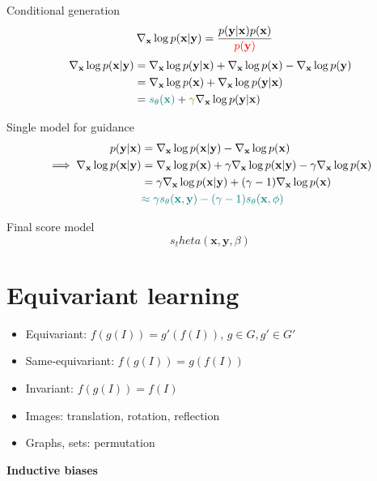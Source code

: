 \documentclass[handout, aspectratio=169,xcolor=dvipsnames]{beamer}
\newcommand{\bx}{\mathbf{x}}
\newcommand{\by}{\mathbf{y}}
\newcommand{\nbx}{\nabla_{\bx}}
\begin{document}
\begin{frame}{Conditional generation}
  \begin{align*}
   \nbx \log p(\bx | \by) &= \frac{p(\by | \bx) p(\bx)}{\textcolor{red}{p(\by)}}
  \end{align*}
  \pause
  \begin{align*}
    \nbx \log p(\bx | \by) &= \nbx \log p(\by | \bx) + \nbx \log p(\bx) - \nbx \log p(\by)\\
                           &= \nbx \log p(\bx) + \nbx \log p(\by | \bx) \\
                           &= \textcolor{teal}{s_\theta(\bx)} + \textcolor{olive}{\gamma} \nbx \log p(\by | \bx)
  \end{align*}
\end{frame}

\begin{frame}{Single model for guidance}
  \begin{align*}
    p(\by | \bx) &= \nbx \log p(\bx | \by) - \nbx \log p(\bx)\\
    \implies  \nbx \log p(\bx | \by) &= \nbx \log p(\bx) + \gamma \nbx \log p(\bx | \by) - \gamma \nbx \log p(\bx) \\
                                     &= \gamma \nbx \log p(\bx | \by) + (\gamma - 1)  \nbx \log p(\bx)\\
                                     &\textcolor{teal}{\approx \gamma s_\theta(\bx, \by) - (\gamma - 1) s_\theta(\bx, \phi)}
  \end{align*}
\end{frame}

\begin{frame}{Final score model}
  \[
  s_theta(\bx, \by, \beta)
  \]
\end{frame}

\section{Equivariant learning}
\begin{frame}{}
  \begin{itemize}
    \item Equivariant: $f(g(I)) = g'(f(I))$, $g \in G, g' \in G'$
    \pause
    \item Same-equivariant: $f(g(I)) = g(f(I))$
    \pause
    \item Invariant: $f(g(I)) = f(I)$
  \end{itemize}

  \pause

  \vspace{0.5cm}
  \begin{itemize}
    \item Images: translation, rotation, reflection
    \item Graphs, sets: permutation
  \end{itemize}

  \pause

  \vspace{1.5cm}
  \centering
  \textbf{Inductive biases}
\end{frame}
\end{document}
